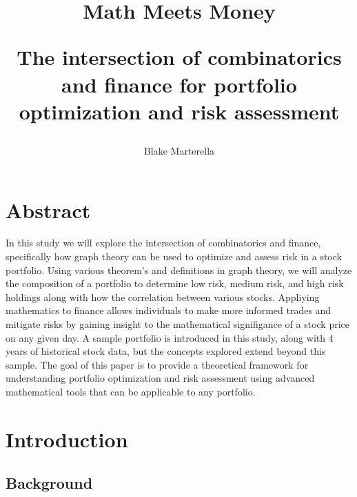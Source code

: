 \documentclass{article}
\begin{document}
\title{
 Math Meets Money \\ 
\begin{large} 
The intersection of combinatorics and finance for portfolio optimization and risk assessment
\end{large} }
\author{Blake Marterella}
\date{}

\maketitle

\section*{Abstract}

In this study we will explore the intersection of combinatorics and finance, specifically how graph theory can be used to optimize and assess risk in a stock portfolio. Using various theorem's and definitions in graph theory, we will analyze the composition of a portfolio to determine low risk, medium risk, and high risk holdings along with how the correlation between various stocks. Appliying mathematics to finance allows individuals to make more informed trades and mitigate risks by gaining insight to the mathematical signifigance of a stock price on any given day. A sample portfolio is introduced in this study, along with 4 years of historical stock data, but the concepts explored extend beyond this sample. The goal of this paper is to provide a theoretical framework for understanding portfolio optimization and risk assessment using advanced mathematical tools that can be applicable to any portfolio.

\tableofcontents

\section{Introduction}

\subsection{Background}
\end{document}
